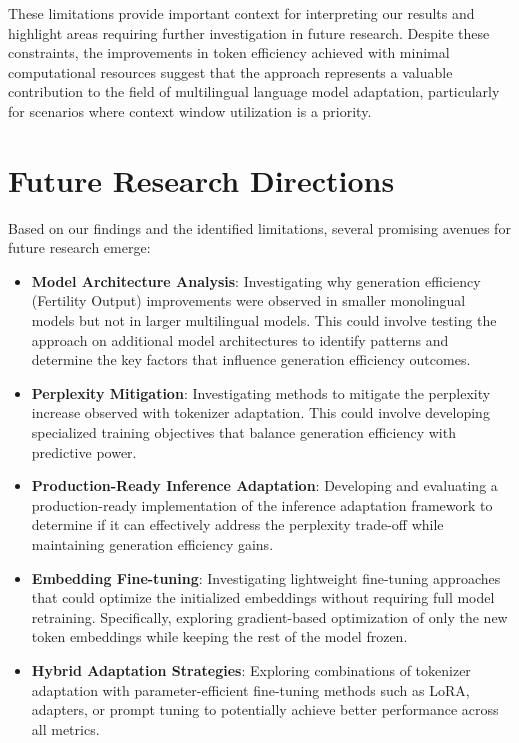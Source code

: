 These limitations provide important context for interpreting our results and highlight areas requiring further investigation in future research. Despite these constraints, the improvements in token efficiency achieved with minimal computational resources suggest that the approach represents a valuable contribution to the field of multilingual language model adaptation, particularly for scenarios where context window utilization is a priority.

\section{Future Research Directions}
Based on our findings and the identified limitations, several promising avenues for future research emerge:

\begin{itemize}
    \item \textbf{Model Architecture Analysis}: Investigating why generation efficiency (Fertility Output) improvements were observed in smaller monolingual models but not in larger multilingual models. This could involve testing the approach on additional model architectures to identify patterns and determine the key factors that influence generation efficiency outcomes.
    
    \item \textbf{Perplexity Mitigation}: Investigating methods to mitigate the perplexity increase observed with tokenizer adaptation. This could involve developing specialized training objectives that balance generation efficiency with predictive power.
    
    \item \textbf{Production-Ready Inference Adaptation}: Developing and evaluating a production-ready implementation of the inference adaptation framework to determine if it can effectively address the perplexity trade-off while maintaining generation efficiency gains.
    
    \item \textbf{Embedding Fine-tuning}: Investigating lightweight fine-tuning approaches that could optimize the initialized embeddings without requiring full model retraining. Specifically, exploring gradient-based optimization of only the new token embeddings while keeping the rest of the model frozen.
    
    \item \textbf{Hybrid Adaptation Strategies}: Exploring combinations of tokenizer adaptation with parameter-efficient fine-tuning methods such as LoRA, adapters, or prompt tuning to potentially achieve better performance across all metrics.
    

\end{itemize}
